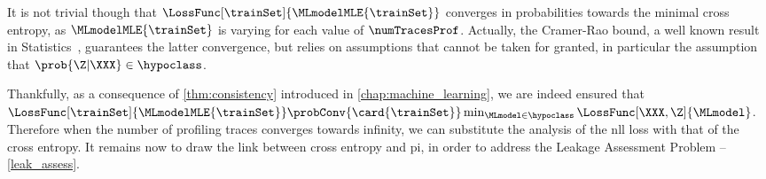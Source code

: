 It is not trivial though that \(\LossFunc[\trainSet]{\MLmodelMLE{\trainSet}}\) converges in probabilities towards the minimal cross entropy, as \(\MLmodelMLE{\trainSet}\) is varying for each value of \(\numTracesProf\).
Actually, the Cramer-Rao bound, a well known result in Statistics~\cite{cramer_mathematical_1999}, guarantees the latter convergence, but relies on assumptions that cannot be taken for granted, in particular the assumption that \(\prob{\Z | \XXX} \in \hypoclass\).

Thankfully, as a consequence of \autoref{thm:consistency} introduced in \autoref{chap:machine_learning}, we are indeed ensured that \(\LossFunc[\trainSet]{\MLmodelMLE{\trainSet}} \probConv{\card{\trainSet}} \min_{\MLmodel \in \hypoclass} \LossFunc[\XXX, \Z]{\MLmodel}\).
Therefore when the number of profiling traces converges towards infinity, we can substitute the analysis of the \gls{nll} loss with that of the cross entropy. 
It remains now to draw the link between cross entropy and \gls{pi}, in order to address the Leakage Assessment Problem -- \ie{} \autoref{leak_assess}.